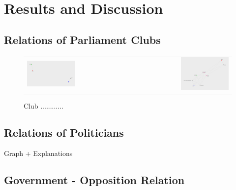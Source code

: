 \chapter{Results and Discussion}
\label{chap:evaluation}

\section{Relations of Parliament Clubs}
\label{sec:relations_clubs}

\begin{figure}
\begin{tabular}{ l r}
	\includegraphics[width=0.49\textwidth]{imgs/graphs/club-graphs/clubs_21} & \includegraphics[width=0.49\textwidth]{imgs/graphs/club-graphs/clubs_25}
\end{tabular}
	\caption{Club ............}
	\label{fig:club_graphs1}
\end{figure}


\section{Relations of Politicians}
Graph + Explanations

\section{Government - Opposition Relation}
\label{sec:gov_opp_relation}

